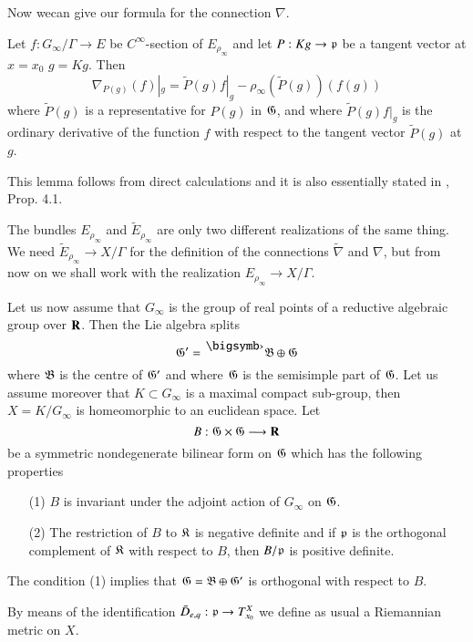 Now we\pageoriginale can give our formula for the connection $\nabla$.

\begin{lemma}\label{art5-lem1.4}
Let $f: G_\infty/ \Gamma \to E$ be $C^\infty$-section of $E_{\rho_\infty}$ and let $P: Kg \to \mathfrak{p}$ be a tangent vector at $x = x_0$ $g = Kg$. Then
$$
\nabla_{P(g)} (f) |_g = \tilde{P} (g) f |_g - \rho_\infty (\tilde{P} (g)) (f(g))
$$
where $\tilde{P}(g)$ is a representative for $P(g)$ in $\mathfrak{G}$, and where $\tilde{P}(g) f|_g$ is the ordinary derivative of the function $f$ with respect to the tangent vector $\tilde{P} (g)$ at $g$.
\end{lemma}

This lemma follows from direct calculations and it is also essentially stated in \cite{art5-key10}, Prop. 4.1.

\begin{remark*}
The bundles $E_{\rho_\infty}$ and $\tilde{E}_{\rho_\infty}$ are only two different realizations of the same thing. We need $\tilde{E}_{\rho_\infty} \to X / \Gamma$ for the definition of the connections $\tilde{\nabla}$ and $\nabla$, but from now on we shall work with the realization $E_{\rho_\infty} \to X / \Gamma$.
\end{remark*}

Let us now assume that $G_\infty$ is the group of real points of a reductive algebraic group over $\mathbf{R}$. Then the Lie algebra splits 
$$
\fG' = {}^\bigdot \fB\oplus \fG
$$
where $\mathfrak{B}$ is the centre of $\mathfrak{G}'$ and where $\mathfrak{G}$ is the semisimple part of $\mathfrak{G}$. Let us assume moreover that $K \subset G_\infty$ is a maximal compact sub-group, then $X = K/ G_\infty$ is homeomorphic to an euclidean space. Let 
$$
B : \mathfrak{G} \times \mathfrak{G} \longrightarrow \mathbf{R}
$$
be a symmetric nondegenerate bilinear form on $\mathfrak{G}$ which has the following properties
\begin{itemize}
\item[(1)] $B$ is invariant under the adjoint action of $G_\infty$ on $\mathfrak{G}$.

\item[(2)] The restriction of $B$ to $\mathfrak{K}$ is negative definite and if $\mathfrak{p}$ is the orthogonal complement of $\mathfrak{K}$ with respect to $B$, then $B / \mathfrak{p}$ is positive definite.
\end{itemize}

The condition (1) implies that $\mathfrak{G} = \mathfrak{B} \oplus \mathfrak{G}'$ is orthogonal with respect to $B$.

By means of the identification $\bar{D}_{e,q} : \mathfrak{p} \to T^X_{x_0}$ we define as usual a Riemannian metric on $X$.

